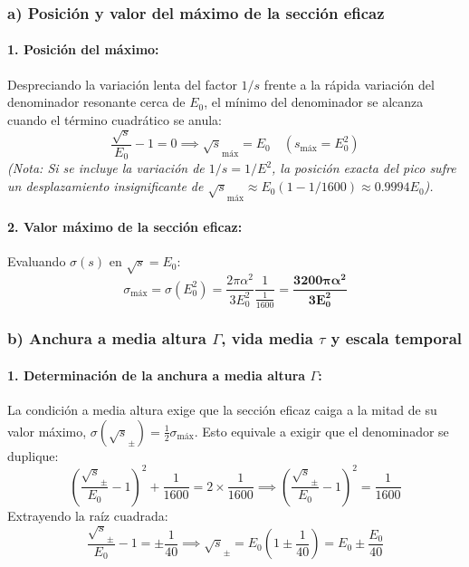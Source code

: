 \begin{problema}
\subsubsection*{a) Posición y valor del máximo de la sección eficaz}

\paragraph{1. Posición del máximo:}
Despreciando la variación lenta del factor $1/s$ frente a la rápida variación del denominador resonante cerca de $E_0$, el mínimo del denominador se alcanza cuando el término cuadrático se anula:
\begin{equation*}
\frac{\sqrt{s}}{E_0} - 1 = 0 \implies \sqrt{s}_{\text{máx}} = E_0 \quad (s_{\text{máx}} = E_0^2)
\end{equation*}
\textit{(Nota: Si se incluye la variación de $1/s = 1/E^2$, la posición exacta del pico sufre un desplazamiento insignificante de $\sqrt{s}_{\text{máx}} \approx E_0 (1 - 1/1600) \approx 0.9994 E_0$).}

\paragraph{2. Valor máximo de la sección eficaz:}
Evaluando $\sigma(s)$ en $\sqrt{s} = E_0$:
\begin{equation*}
\sigma_{\text{máx}} = \sigma(E_0^2) = \frac{2\pi\alpha^2}{3 E_0^2} \frac{1}{\frac{1}{1600}} = \mathbf{\frac{3200 \pi \alpha^2}{3 E_0^2}}
\end{equation*}

\subsubsection*{b) Anchura a media altura $\Gamma$, vida media $\tau$ y escala temporal}

\paragraph{1. Determinación de la anchura a media altura $\Gamma$:}
La condición a media altura exige que la sección eficaz caiga a la mitad de su valor máximo, $\sigma(\sqrt{s}_{\pm}) = \frac{1}{2} \sigma_{\text{máx}}$. Esto equivale a exigir que el denominador se duplique:
\begin{equation*}
\left( \frac{\sqrt{s}_{\pm}}{E_0} - 1 \right)^2 + \frac{1}{1600} = 2 \times \frac{1}{1600} \implies \left( \frac{\sqrt{s}_{\pm}}{E_0} - 1 \right)^2 = \frac{1}{1600}
\end{equation*}
Extrayendo la raíz cuadrada:
\begin{equation*}
\frac{\sqrt{s}_{\pm}}{E_0} - 1 = \pm \frac{1}{40} \implies \sqrt{s}_{\pm} = E_0 \left( 1 \pm \frac{1}{40} \right) = E_0 \pm \frac{E_0}{40}
\end{equation*}


\end{problema}
